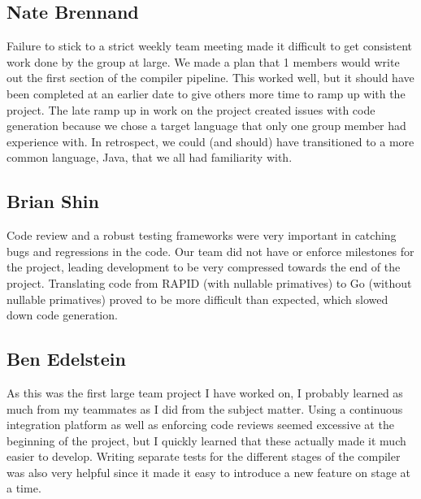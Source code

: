 
\subsection*{Nate Brennand}

Failure to stick to a strict weekly team meeting made it difficult to get consistent work done by the group at large.
We made a plan that 1  members would write out the first section of the compiler pipeline.
This worked well, but it should have been completed at an earlier date to give others more time to ramp up with the project.
The late ramp up in work on the project created issues with code generation because we chose a target language that only one group member had experience with.
In retrospect, we could (and should) have transitioned to a more common language, Java, that we all had familiarity with.

\subsection*{Brian Shin}

Code review and a robust testing frameworks were very important in catching bugs and regressions in the code.
Our team did not have or enforce milestones for the project, leading development to be very compressed towards the end of the project.
Translating code from RAPID (with nullable primatives) to Go (without nullable primatives) proved to be more difficult than expected, which slowed down code generation.


\subsection*{Ben Edelstein}

As this was the first large team project I have worked on, I probably learned as much from my teammates as I did from the subject matter. Using a continuous integration platform as well as enforcing code reviews seemed excessive at the beginning of the project, but I quickly learned that these actually made it much easier to develop. Writing separate tests for the different stages of the compiler was also very helpful since it made it easy to introduce a new feature on stage at a time.